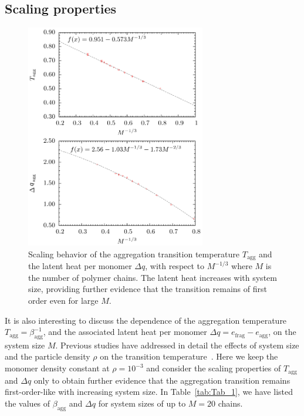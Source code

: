 \documentclass[12pt]{report}
\begin{document}
\subsection{Scaling properties}
%
\begin{figure}
\center
\includegraphics[width = 0.7\textwidth]{chapter7Figs/scalingCombined.eps}
\caption{\label{fig:Fig_6} Scaling behavior of the aggregation transition temperature
$T_{\mathrm{agg}}$ and the latent heat per monomer $\Delta q$, with respect
to $M^{-1/3}$ where $M$ is the number of polymer chains. The latent heat
increases with system size, providing further evidence that the transition
remains of 
first order even for large $M$. }
\end{figure}
%
It is also interesting to discuss the dependence of the aggregation
temperature $ T_{\mathrm{agg}} = \beta_{\mathrm{agg}}^{-1}$, and the
associated latent heat per monomer
$\Delta q = e_{\mathrm{frag}} - e_{\mathrm{agg}}$, on the system size $M$. 
Previous studies have addressed in detail the effects of system size
and the particle density $\rho$ on the transition
temperature~\cite{Zieren2014,Zieren2015}.
Here we keep the monomer density constant at $\rho = 10^{-3}$ and consider
the scaling properties of $T_{\mathrm{agg}}$ and $\Delta q$ only to obtain
further
evidence that the aggregation transition
remains
first-order-like with increasing system size. In Table~\ref{tab:Tab_1}, we
have listed the values of $\beta_{\mathrm{agg}}$ 
and $\Delta q$ for system sizes of up to $M = 20$ chains. 
\end{document}
